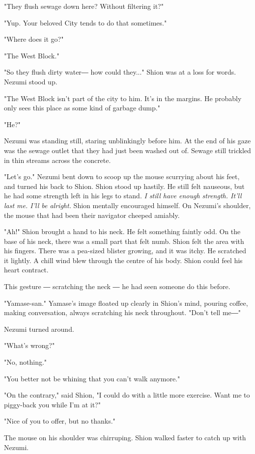 "They flush sewage down here? Without filtering it?"

"Yup. Your beloved City tends to do that sometimes."

"Where does it go?"

"The West Block."

"So they flush dirty water― how could they..." Shion was at a loss for
words. Nezumi stood up.

"The West Block isn't part of the city to him. It's in the margins. He
probably only sees this place as some kind of garbage dump."

"He?"

Nezumi was standing still, staring unblinkingly before him. At the end
of his gaze was the sewage outlet that they had just been washed out of.
Sewage still trickled in thin streams across the concrete.

"Let's go." Nezumi bent down to scoop up the mouse scurrying about his
feet, and turned his back to Shion. Shion stood up hastily. He still
felt nauseous, but he had some strength left in his legs to stand. \emph{I
	still have enough strength. It'll last me. I'll be alright.} Shion
mentally encouraged himself. On Nezumi's shoulder, the mouse that had
been their navigator cheeped amiably.

"Ah!" Shion brought a hand to his neck. He felt something faintly odd.
On the base of his neck, there was a small part that felt numb. Shion
felt the area with his fingers. There was a pea-sized blister growing,
and it was itchy. He scratched it lightly. A chill wind blew through the
centre of his body. Shion could feel his heart contract.

This gesture ― scratching the neck ― he had seen someone do this before.

"Yamase-san." Yamase's image floated up clearly in Shion's mind, pouring
coffee, making conversation, always scratching his neck throughout.
"Don't tell me―"

Nezumi turned around.

"What's wrong?"

"No, nothing."

"You better not be whining that you can't walk anymore."

"On the contrary," said Shion, "I could do with a little more exercise.
Want me to piggy-back you while I'm at it?"

"Nice of you to offer, but no thanks."

The mouse on his shoulder was chirruping. Shion walked faster to catch
up with Nezumi.

